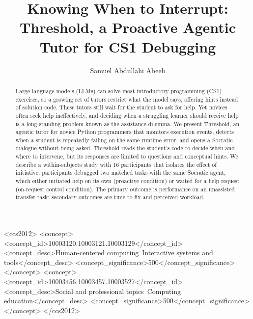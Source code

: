 \documentclass[manuscript,review]{acmart}
\begin{document}
\title{Knowing When to Interrupt: Threshold, a Proactive Agentic Tutor for CS1 Debugging}

\author{Samuel Abdullahi Abeeb}

\renewcommand{\shortauthors}{Abdullahi Abeeb}

\begin{abstract}
Large language models (LLMs) can solve most introductory programming (CS1) exercises, so a growing set of tutors restrict what the model says, offering hints instead of solution code. These tutors still wait for the student to ask for help. Yet novices often seek help ineffectively, and deciding when a struggling learner should receive help is a long-standing problem known as the assistance dilemma. We present Threshold, an agentic tutor for novice Python programmers that monitors execution events, detects when a student is repeatedly failing on the same runtime error, and opens a Socratic dialogue without being asked. Threshold reads the student's code to decide when and where to intervene, but its responses are limited to questions and conceptual hints. We describe a within-subjects study with 16 participants that isolates the effect of initiative: participants debugged two matched tasks with the same Socratic agent, which either initiated help on its own (proactive condition) or waited for a help request (on-request control condition). The primary outcome is performance on an unassisted transfer task; secondary outcomes are time-to-fix and perceived workload.
\end{abstract}

\begin{CCSXML}
<ccs2012>
 <concept>
  <concept_id>10003120.10003121.10003129</concept_id>
  <concept_desc>Human-centered computing~Interactive systems and tools</concept_desc>
  <concept_significance>500</concept_significance>
 </concept>
 <concept>
  <concept_id>10003456.10003457.10003527</concept_id>
  <concept_desc>Social and professional topics~Computing education</concept_desc>
  <concept_significance>500</concept_significance>
 </concept>
</ccs2012>
\end{CCSXML}

\end{document}
